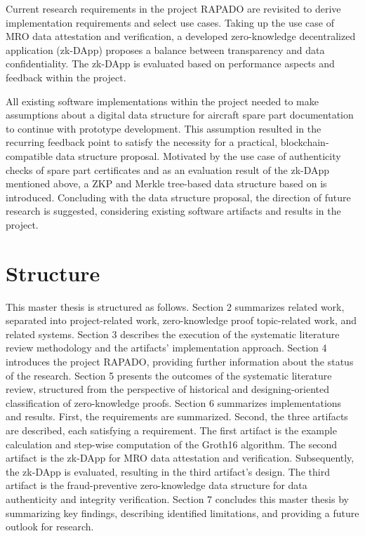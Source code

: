 Current research requirements in the project RAPADO are revisited to derive implementation requirements and select use cases. Taking up the use case of MRO data attestation and verification, a developed zero-knowledge decentralized application (zk-DApp) proposes a balance between transparency and data confidentiality. The zk-DApp is evaluated based on performance aspects and feedback within the project.

All existing software implementations within the project needed to make assumptions about a digital data structure for aircraft spare part documentation to continue with prototype development. This assumption resulted in the recurring feedback point to satisfy the necessity for a practical, blockchain-compatible data structure proposal. Motivated by the use case of authenticity checks of spare part certificates and as an evaluation result of the zk-DApp mentioned above, a ZKP and Merkle tree-based data structure based on \citet{sedlemeirgrenenergy} is introduced. Concluding with the data structure proposal, the direction of future research is suggested, considering existing software artifacts and results in the project.

\section{Structure}
This master thesis is structured as follows. Section 2 summarizes related work, separated into project-related work, zero-knowledge proof topic-related work, and related systems. Section 3 describes the execution of the systematic literature review methodology and the artifacts' implementation approach. Section 4 introduces the project RAPADO, providing further information about the status of the research. Section 5 presents the outcomes of the systematic literature review, structured from the perspective of historical and designing-oriented classification of zero-knowledge proofs. Section 6 summarizes implementations and results. First, the requirements are summarized. Second, the three artifacts are described, each satisfying a requirement. The first artifact is the example calculation and step-wise computation of the Groth16 algorithm. The second artifact is the zk-DApp for MRO data attestation and verification. Subsequently, the zk-DApp is evaluated, resulting in the third artifact's design. The third artifact is the fraud-preventive zero-knowledge data structure for data authenticity and integrity verification. Section 7 concludes this master thesis by summarizing key findings, describing identified limitations, and providing a future outlook for research. 
\begin{comment}
ALWAYS START WITH THIS SENTENCE: "This paper/article/etc. is structured as follows." (kein doppelpunkt)
"In Section 2, related work of XYZ is introduced.."
\end{comment}


